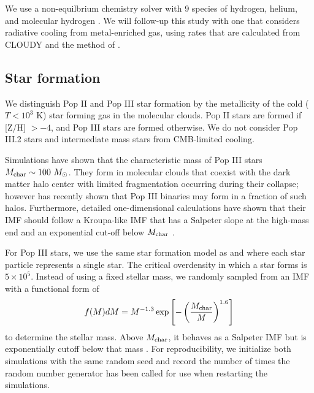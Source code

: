 \documentclass[apjl]{emulateapj}
\begin{document}
We use a non-equilbrium chemistry solver with 9 species of hydrogen,
helium, and molecular hydrogen \citep{Abel97}.  We will follow-up this
study with one that considers radiative cooling from metal-enriched
gas, using rates that are calculated from CLOUDY \citep{CLOUDY} and
the method of \citet{2008MNRAS.385.1443S}.


\subsection{Star formation}

We distinguish Pop II and Pop III star formation by the metallicity of
the cold ($T < 10^3$ K) star forming gas in the molecular clouds.  Pop
II stars are formed if [Z/H] $> -4$, and Pop III stars are formed
otherwise.  We do not consider Pop III.2 stars and intermediate mass
stars from CMB-limited cooling.

Simulations have shown that the characteristic mass of Pop III stars
$M_{\rm char} \sim 100~\Ms$.  They form in molecular clouds that
coexist with the dark matter halo center with limited fragmentation
occurring during their collapse; however \citet{2009Sci...325..601T}
has recently shown that Pop III binaries may form in a fraction of
such halos.  Furthermore, detailed one-dimensional calculations have
shown that their IMF should follow a Kroupa-like IMF that has a
Salpeter slope at the high-mass end and an exponential cut-off below
$M_{\rm char}$ \citep{refs}.

For Pop III stars, we use the same star formation model as
\citet{Abel07} and \citet{Wise08_Gal} where each star particle
represents a single star.  The critical overdensity in which a star
forms is $5 \times 10^5$.  Instead of using a fixed stellar mass, we
randomly sampled from an IMF with a functional form of
%
\begin{equation}
\label{eqn:imf}
f(M)dM = M^{-1.3} \exp\left[-\left(\frac{M_{\rm char}}{M}\right)^{1.6}\right]
\end{equation}
to determine the stellar mass.  Above $M_{\rm char}$, it behaves as a
Salpeter IMF but is exponentially cutoff below that mass
\citep{Chabrier03, Clark09}.  For reproducibility, we initialize both
simulations with the same random seed and record the number of times
the random number generator \citep[Mersenne twister;][]{ref} has been
called for use when restarting the simulations.  
\end{document}
